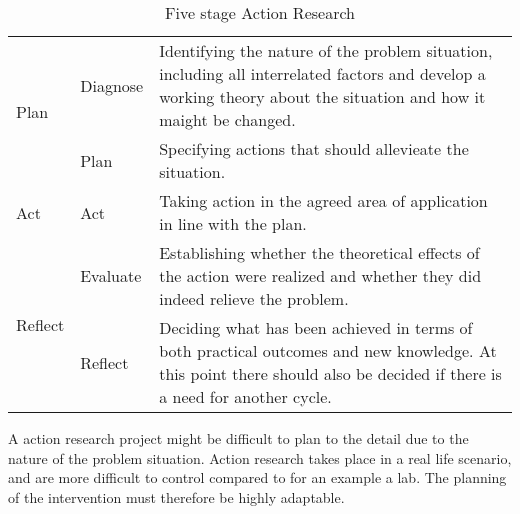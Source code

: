 \begin{table}
\begin{tabular}{m{2cm} m{2cm} m{8cm}}
\hline
\multirow{2}{*}{Plan} & Diagnose & Identifying the nature of the problem situation, including all interrelated factors and develop a working theory about the situation and how it maight be changed.\\
\cline{2-3}
 & Plan & Specifying actions that should allevieate the situation. \\
\hline
Act & Act & Taking action in the agreed area of application in line with the plan.\\
\hline
\multirow{2}{*}{Reflect} & Evaluate & Establishing whether the theoretical effects of the action were realized and whether they did indeed relieve the problem. \\
\cline{2-3}
 & Reflect &  Deciding what has been achieved in terms of both practical outcomes and new knowledge. At this point there should also be decided if there is a need for another cycle. \\
\hline
\end{tabular} 
\caption{Five stage Action Research\cite{bjo:risc}}
\label{tab:5stagear}
\end{table}
A action research project might be difficult to plan to the detail due to the nature of the problem situation. 
Action research takes place in a real life scenario, and are more difficult to control compared to for an example a lab.
The planning of the intervention must therefore be highly adaptable.





